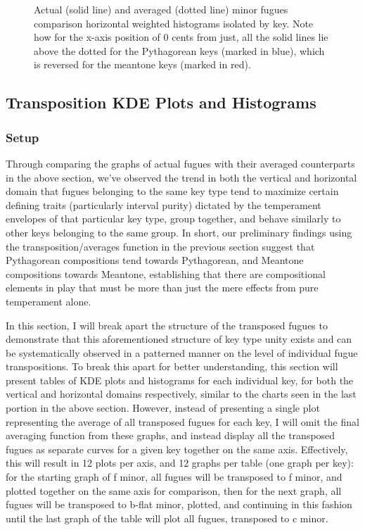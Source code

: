 \begin{figure}[H]
\vspace{1.5em}
    \centering
    \caption[Actual and Averaged Minor Fugues Comparison Horizontal Weighted Histograms Isolated by Key. ]{Actual (solid line) and averaged (dotted line) minor fugues comparison horizontal weighted histograms isolated by key. Note how for the x-axis position of 0 cents from just, all the solid lines lie above the dotted for the Pythagorean keys (marked in blue), which is reversed for the meantone keys (marked in red).}
\end{figure}    \subsection{Transposition KDE Plots and
Histograms}\label{transposition-kde-plots-and-histograms}

\subsubsection{Setup}\label{setup}

Through comparing the graphs of actual fugues with their averaged
counterparts in the above section, we've observed the trend in both the
vertical and horizontal domain that fugues belonging to the same key
type tend to maximize certain defining traits (particularly interval
purity) dictated by the temperament envelopes of that particular key
type, group together, and behave similarly to other keys belonging to
the same group. In short, our preliminary findings using the
transposition/averages function in the previous section suggest that
Pythagorean compositions tend towards Pythagorean, and Meantone
compositions towards Meantone, establishing that there are compositional
elements in play that must be more than just the mere effects from pure
temperament alone.

In this section, I will break apart the structure of the transposed
fugues to demonstrate that this aforementioned structure of key type
unity exists and can be systematically observed in a patterned manner on
the level of individual fugue transpositions. To break this apart for
better understanding, this section will present tables of KDE plots and
histograms for each individual key, for both the vertical and horizontal
domains respectively, similar to the charts seen in the last portion in
the above section. However, instead of presenting a single plot
representing the average of all transposed fugues for each key, I will
omit the final averaging function from these graphs, and instead display
all the transposed fugues as separate curves for a given key together on
the same axis. Effectively, this will result in 12 plots per axis, and
12 graphs per table (one graph per key): for the starting graph of f
minor, all fugues will be transposed to f minor, and plotted together on
the same axis for comparison, then for the next graph, all fugues will
be transposed to b-flat minor, plotted, and continuing in this fashion
until the last graph of the table will plot all fugues, transposed to c
minor.

